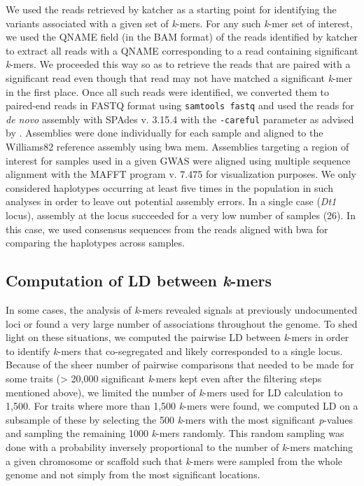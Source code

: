 We used the reads retrieved by katcher as a starting point for identifying the
variants associated with a given set of \emph{k}-mers. For any such
\emph{k}-mer set of interest, we used the QNAME field (in the BAM format) of
the reads identified by katcher to extract all reads with a QNAME corresponding
to a read containing significant \emph{k}-mers. We proceeded this way so as to
retrieve the reads that are paired with a significant read even though that
read may not have matched a significant \emph{k}-mer in the first place. Once
all such reads were identified, we converted them to paired-end reads in FASTQ
format using \texttt{samtools fastq} and used the reads for \emph{de novo}
assembly with SPAdes v. 3.15.4 \citep{spades} with the \texttt{-\-careful}
parameter as advised by \cite{voichek2020}. Assemblies were done individually
for each sample and aligned to the Williams82 reference assembly using bwa mem.
Assemblies targeting a region of interest for samples used in a given GWAS were
aligned using multiple sequence alignment with the MAFFT program v. 7.475
\citep{katoh2002} for visualization purposes. We only considered haplotypes
occurring at least five times in the population in such analyses in order to
leave out potential assembly errors. In a single case (\emph{Dt1} locus),
assembly at the locus succeeded for a very low number of samples (26). In this
case, we used consensus sequences from the reads aligned with bwa for comparing
the haplotypes across samples.

\subsection*{Computation of LD between \emph{k}-mers}
\label{sv-gwas-ld-kmers}

In some cases, the analysis of \emph{k}-mers revealed signals at previously
undocumented loci or found a very large number of associations throughout the
genome. To shed light on these situations, we computed the pairwise LD between
\emph{k}-mers in order to identify \emph{k}-mers that co-segregated and
likely corresponded to a single locus. Because of the sheer number of pairwise
comparisons that needed to be made for some traits (> 20,000 significant
\emph{k}-mers kept even after the filtering steps mentioned above), we limited
the number of \emph{k}-mers used for LD calculation to 1,500. For traits where
more than 1,500 \emph{k}-mers were found, we computed LD on a subsample of
these by selecting the 500 \emph{k}-mers with the most significant
\emph{p}-values and sampling the remaining 1000 \emph{k}-mers randomly. This
random sampling was done with a probability inversely proportional to the
number of \emph{k}-mers matching a given chromosome or scaffold such that
\emph{k}-mers were sampled from the whole genome and not simply from the most
significant locations.

